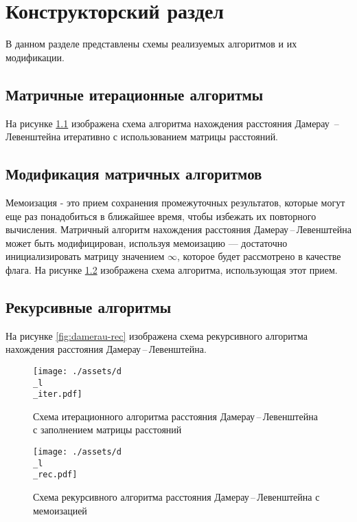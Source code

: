 \chapter{Конструкторский раздел}
В данном разделе представлены схемы реализуемых алгоритмов и их модификации.
\section{Матричные итерационные алгоритмы}
На рисунке \ref{fig:damerau-Page-1} изображена схема алгоритма нахождения расстояния Дамерау \,--\,Левенштейна итеративно  с использованием матрицы расстояний.
\section{Модификация матричных алгоритмов}
Мемоизация - это прием сохранения промежуточных результатов, которые могут еще раз понадобиться в ближайшее время, чтобы избежать их повторного вычисления. 
Матричный алгоритм нахождения расстояния Дамерау\,--\,Левенштейна может быть модифицирован, используя мемоизацию --- достаточно инициализировать матрицу значением $\infty$, которое будет рассмотрено в качестве флага.
На рисунке \ref{fig:damerau-mem} изображена схема алгоритма, использующая этот прием.
\section{Рекурсивные алгоритмы}
На рисунке \ref{fig:damerau-rec} изображена схема рекурсивного алгоритма  нахождения расстояния Дамерау\,--\,Левенштейна.
\newpage 


\begin{figure}[!ht]
	\begin{center}
		\texttt{[image: ./assets/d\\\_l\\\_iter.pdf]}
	\end{center}
	
	\caption{Схема итерационного алгоритма расстояния Дамерау\,--\,Левенштейна с заполнением матрицы расстояний}
	\label{fig:damerau-Page-1}
\end{figure}

\begin{figure}[!ht]
	\begin{center}
		\texttt{[image: ./assets/d\\\_l\\\_rec.pdf]}
	\end{center}
	
	\caption{Схема рекурсивного алгоритма расстояния Дамерау\,--\,Левенштейна с мемоизацией}
	\label{fig:damerau-mem}
\end{figure}


